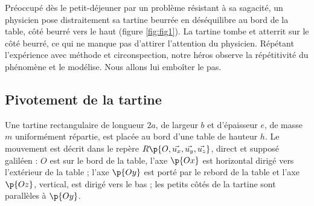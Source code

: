\documentclass[a4paper,french,bookmarks]{article}
\begin{document}
\begin{minipage}{0.5\linewidth}
\begin{center}
        \end{center}

	    \label{fig:fig1}
    \end{minipage}
    \begin{minipage}{0.5\linewidth}
        Préoccupé dès le petit-déjeuner par un problème résistant à sa sagacité, un physicien pose distraitement sa tartine beurrée en déséquilibre au bord de la table, côté beurré vers le haut (figure \ref{fig:fig1}). La tartine tombe et atterrit sur le côté beurré, ce qui ne manque pas d'attirer l'attention du physicien. Répétant l'expérience avec méthode et circonspection, notre héros observe la répétitivité du phénomène et le modélise. Nous allons lui emboîter le pas.
    \end{minipage}

    \subsection{Pivotement de la tartine}

    Une tartine rectangulaire de longueur $2a$, de largeur $b$ et d'épaisseur $e$, de masse $m$ uniformément répartie, est placée au bord d'une table de hauteur $h$. Le mouvement est décrit dans le repère $R\p{O, \vec{u_x}, \vec{u_y}, \vec{u_z}}$, direct et supposé galiléen : $O$ est sur le bord de la table, l'axe $\p{Ox}$ est horizontal dirigé vers l'extérieur de la table ; l'axe $\p{Oy}$ est porté par le rebord de la table et l'axe $\p{Oz}$, vertical, est dirigé vers le bas ; les petits côtés de la tartine sont parallèles à $\p{Oy}$.
\end{document}

